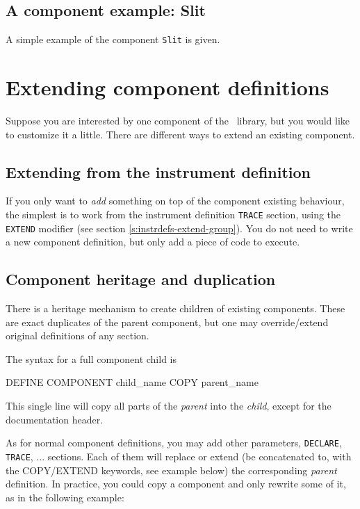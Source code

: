 \subsection{A component example: Slit}
\label{s:slit}
A simple example of the component \texttt{Slit} is given.



\section{Extending component definitions}
\label{s:compdefs-extend}

Suppose you are interested by one component of the \MCS\ library, but you would
like to customize it a little. There are different ways to extend an existing
component.

\subsection{Extending from the instrument definition}

If you only want to \emph{add} something on top of the component existing behaviour, the simplest is to work from the instrument definition \texttt{TRACE} section, using the \texttt{EXTEND} modifier (see section \ref{s:instrdefs-extend-group}). You do not need to write a new component definition, but only add a piece of code to execute.

\subsection{Component heritage and duplication}

There is a heritage mechanism to create children of existing components. These
are exact duplicates of the parent component, but one may override/extend
original definitions of any section.

The syntax for a full component child is
\begin{mcstas}
DEFINE COMPONENT child_name COPY parent_name
\end{mcstas}

This single line will copy all parts of the {\it parent} into the {\it child}, except for the documentation header.

As for normal component definitions, you may add other parameters,
\texttt{DECLARE}, \texttt{TRACE}, ... sections. Each of them will replace or
extend (be concatenated to, with the COPY/EXTEND keywords, see example below)
the corresponding {\it parent} definition. In practice, you could copy a
component and only rewrite some of it, as in the following example:

